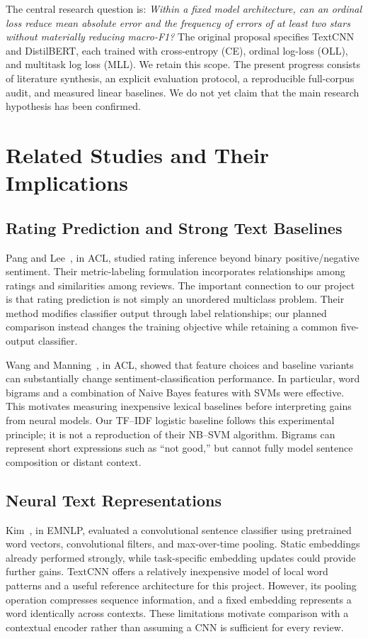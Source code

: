 \documentclass[conference]{IEEEtran}
\begin{document}
The central research question is: \emph{Within a fixed model architecture, can an ordinal loss reduce mean absolute error and the frequency of errors of at least two stars without materially reducing macro-F1?} The original proposal specifies TextCNN and DistilBERT, each trained with cross-entropy (CE), ordinal log-loss (OLL), and multitask log loss (MLL). We retain this scope. The present progress consists of literature synthesis, an explicit evaluation protocol, a reproducible full-corpus audit, and measured linear baselines. We do not yet claim that the main research hypothesis has been confirmed.

\section{Related Studies and Their Implications}
\subsection{Rating Prediction and Strong Text Baselines}
Pang and Lee~\cite{pang2005}, in ACL, studied rating inference beyond binary positive/negative sentiment. Their metric-labeling formulation incorporates relationships among ratings and similarities among reviews. The important connection to our project is that rating prediction is not simply an unordered multiclass problem. Their method modifies classifier output through label relationships; our planned comparison instead changes the training objective while retaining a common five-output classifier.

Wang and Manning~\cite{wang2012}, in ACL, showed that feature choices and baseline variants can substantially change sentiment-classification performance. In particular, word bigrams and a combination of Naive Bayes features with SVMs were effective. This motivates measuring inexpensive lexical baselines before interpreting gains from neural models. Our TF--IDF logistic baseline follows this experimental principle; it is not a reproduction of their NB--SVM algorithm. Bigrams can represent short expressions such as ``not good,'' but cannot fully model sentence composition or distant context.

\subsection{Neural Text Representations}
Kim~\cite{kim2014}, in EMNLP, evaluated a convolutional sentence classifier using pretrained word vectors, convolutional filters, and max-over-time pooling. Static embeddings already performed strongly, while task-specific embedding updates could provide further gains. TextCNN offers a relatively inexpensive model of local word patterns and a useful reference architecture for this project. However, its pooling operation compresses sequence information, and a fixed embedding represents a word identically across contexts. These limitations motivate comparison with a contextual encoder rather than assuming a CNN is sufficient for every review.
\end{document}
